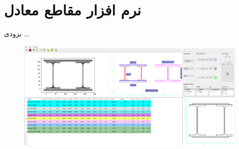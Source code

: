 \section{نرم افزار مقاطع معادل}

بزودی ...

 \begin{figure}[H]
     \centering
     \includegraphics[scale=0.3]{figures/sections}
 \end{figure}
 

